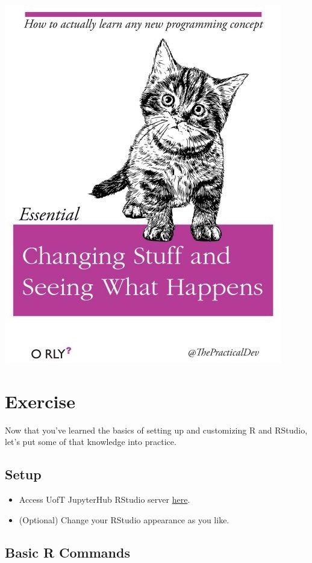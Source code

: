 \documentclass[
]{book}
\providecommand{\tightlist}{%
  \setlength{\itemsep}{0pt}\setlength{\parskip}{0pt}}
\begin{document}
\includegraphics{images/changing-stuff.jpg}

\hypertarget{exercise}{%
\section{Exercise}\label{exercise}}

Now that you've learned the basics of setting up and customizing R and RStudio, let's put some of that knowledge into practice.

\hypertarget{setup}{%
\subsection{Setup}\label{setup}}

\begin{itemize}
\tightlist
\item
  Access UofT JupyterHub RStudio server \href{https://r.datatools.utoronto.ca/}{here}.
\item
  (Optional) Change your RStudio appearance as you like.
\end{itemize}

\hypertarget{basic-r-commands}{%
\subsection{Basic R Commands}\label{basic-r-commands}}
\end{document}
